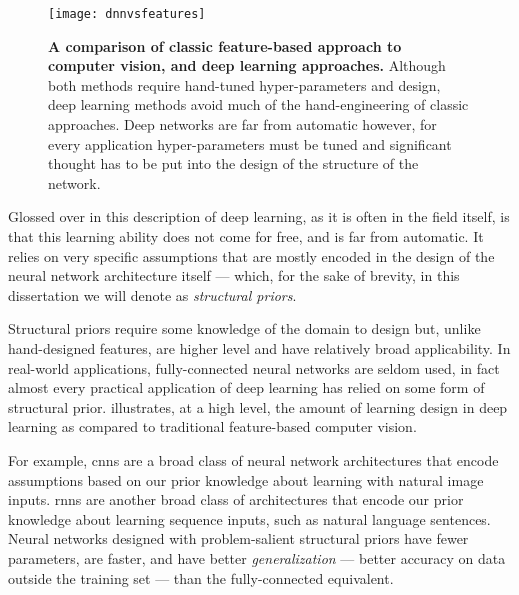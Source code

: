 \documentclass[thesis]{subfiles}
\begin{document}
\begin{figure}[tbp]
	\centering
	\texttt{[image: dnnvsfeatures]}
	\caption[Classic feature-based approach \vs{}deep learning]{\textbf{A comparison of classic feature-based approach to computer vision, and deep learning approaches.} Although both methods require hand-tuned hyper-parameters and design, deep learning methods avoid much of the hand-engineering of classic approaches. Deep networks are far from automatic however, for every application hyper-parameters must be tuned and significant thought has to be put into the design of the structure of the network.}\label{dnnvsfeatures}
\end{figure}
	
Glossed over in this description of deep learning, as it is often in the field itself, is that this learning ability does not come for free, and is far from automatic. It relies on very specific assumptions that are mostly encoded in the design of the neural network architecture itself --- which, for the sake of brevity, in this dissertation we will denote as \emph{structural priors}.

Structural priors require some knowledge of the domain to design but, unlike hand-designed features, are higher level and have relatively broad applicability. In real-world applications, fully-connected neural networks are seldom used, in fact almost every practical application of deep learning has relied on some form of structural prior.  illustrates, at a high level, the amount of learning \vs{}design in deep learning as compared to traditional feature-based computer vision.

For example, \glspl{cnn} are a broad class of neural network architectures that encode assumptions based on our prior knowledge about learning with natural image inputs. \Glspl{rnn} are another broad class of architectures that encode our prior knowledge about learning sequence inputs, such as natural language sentences. Neural networks designed with problem-salient structural priors have fewer parameters, are faster, and have better \emph{generalization} --- better accuracy on data outside the training set --- than the fully-connected equivalent.
\end{document}
